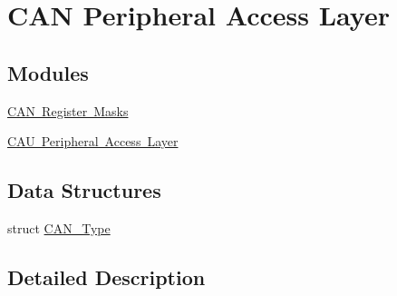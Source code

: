 \hypertarget{group___c_a_n___peripheral___access___layer}{}\section{C\+AN Peripheral Access Layer}
\label{group___c_a_n___peripheral___access___layer}
\subsection*{Modules}
\begin{DoxyCompactItemize}
\item 
\mbox{\hyperlink{group___c_a_n___register___masks}{C\+A\+N Register Masks}}
\item 
\mbox{\hyperlink{group___c_a_u___peripheral___access___layer}{C\+A\+U Peripheral Access Layer}}
\end{DoxyCompactItemize}
\subsection*{Data Structures}
\begin{DoxyCompactItemize}
\item 
struct \mbox{\hyperlink{struct_c_a_n___type}{C\+A\+N\+\_\+\+Type}}
\end{DoxyCompactItemize}


\subsection{Detailed Description}
